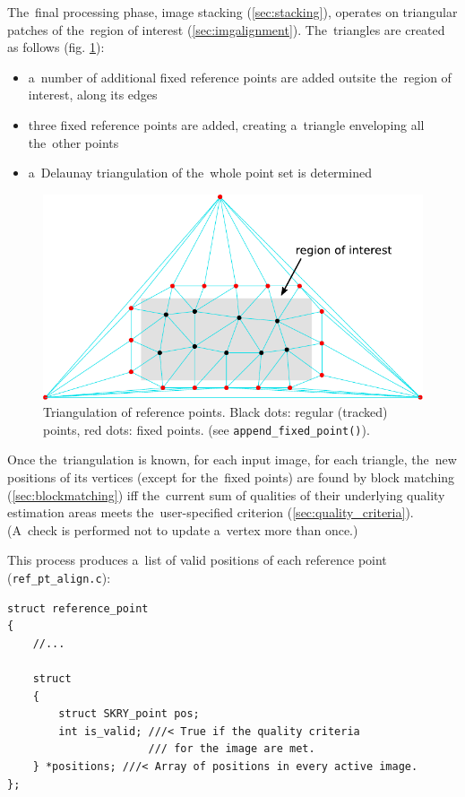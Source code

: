 \documentclass[12pt]{article}
\newcommand{\nbd}{\nobreakdash}
\begin{document}
The~final processing phase, image stacking (\ref{sec:stacking}), operates on triangular patches of the~region of
interest (\ref{sec:imgalignment}). The~triangles are created as follows (fig. \ref{fig:triangulation}):

\begin{itemize}
\item a~number of additional fixed reference points are added outsite the~region of interest, along its edges
\item three fixed reference points are added, creating a~triangle enveloping all the~other points
\item a~Delaunay triangulation of the~whole point set is determined
\end{itemize}

\begin{figure}[H]
\centering
\includegraphics{triangulation.pdf}
\caption{Triangulation of reference points. Black dots: regular (tracked) points, red dots: fixed points.
(see \lstinline$append_fixed_point()$).}
\label{fig:triangulation}
\end{figure}

Once the~triangulation is known, for each input image, for each triangle, the~new positions of its vertices (except for
the~fixed points) are found by block matching (\ref{sec:blockmatching}) iff the~current sum of qualities of their
underlying quality estimation areas meets the~user\nbd-specified criterion (\ref{sec:quality_criteria}). (A~check is
performed not to update a~vertex more than once.)

This process produces a~list of valid positions of each reference point (\lstinline{ref_pt_align.c}):

\begin{lstlisting}
struct reference_point
{
    //...

    struct
    {
        struct SKRY_point pos;
        int is_valid; ///< True if the quality criteria
                      /// for the image are met.
    } *positions; ///< Array of positions in every active image.
};
\end{lstlisting}
\end{document}
